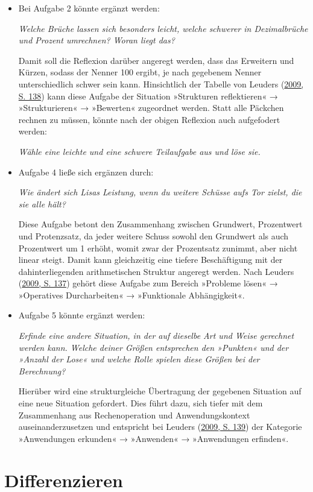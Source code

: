 \documentclass[
]{scrbook}
\theoremstyle{definition}
\theoremstyle{definition}
\theoremstyle{definition}
\theoremstyle{definition}
\theoremstyle{remark}
\begin{document}
\begin{itemize}
\item
  Bei Aufgabe 2 könnte ergänzt werden:

  \emph{Welche Brüche lassen sich besonders leicht, welche schwerer in Dezimalbrüche und Prozent umrechnen? Woran liegt das?}

  Damit soll die Reflexion darüber angeregt werden, dass das Erweitern und Kürzen, sodass der Nenner 100 ergibt, je nach gegebenem Nenner unterschiedlich schwer sein kann. Hinsichtlich der Tabelle von Leuders (\protect\hyperlink{ref-Leuders2009}{2009, S. 138}) kann diese Aufgabe der Situation »Strukturen reflektieren« → »Strukturieren« → »Bewerten« zugeordnet werden. Statt alle Päckchen rechnen zu müssen, könnte nach der obigen Reflexion auch aufgefodert werden:

  \emph{Wähle eine leichte und eine schwere Teilaufgabe aus und löse sie.}
\item
  Aufgabe 4 ließe sich ergänzen durch:

  \emph{Wie ändert sich Lisas Leistung, wenn du weitere Schüsse aufs Tor zielst, die sie alle hält?}

  Diese Aufgabe betont den Zusammenhang zwischen Grundwert, Prozentwert und Protenzsatz, da jeder weitere Schuss sowohl den Grundwert als auch Prozentwert um 1 erhöht, womit zwar der Prozentsatz zunimmt, aber nicht linear steigt. Damit kann gleichzeitig eine tiefere Beschäftigung mit der dahinterliegenden arithmetischen Struktur angeregt werden. Nach Leuders (\protect\hyperlink{ref-Leuders2009}{2009, S. 137}) gehört diese Aufgabe zum Bereich »Probleme lösen« → »Operatives Durcharbeiten« → »Funktionale Abhängigkeit«.
\item
  Aufgabe 5 könnte ergänzt werden:

  \emph{Erfinde eine andere Situation, in der auf dieselbe Art und Weise gerechnet werden kann. Welche deiner Größen entsprechen den »Punkten« und der »Anzahl der Lose« und welche Rolle spielen diese Größen bei der Berechnung?}

  Hierüber wird eine strukturgleiche Übertragung der gegebenen Situation auf eine neue Situation gefordert. Dies führt dazu, sich tiefer mit dem Zusammenhang aus Rechenoperation und Anwendungskontext auseinanderzusetzen und entspricht bei Leuders (\protect\hyperlink{ref-Leuders2009}{2009, S. 139}) der Kategorie »Anwendungen erkunden« → »Anwenden« → »Anwendungen erfinden«.
\end{itemize}

\hypertarget{differenzieren}{%
\section{Differenzieren}\label{differenzieren}}
\end{document}
